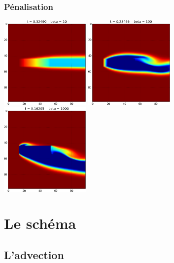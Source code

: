 \documentclass{beamer}
\begin{document}
  \begin{frame}
    \frametitle{Pénalisation}
    \begin{center}
      \includegraphics[width=0.33\textwidth]{penalisation_10.png}
      \includegraphics[width=0.33\textwidth]{penalisation_100.png}
      \includegraphics[width=0.33\textwidth]{penalisation_1000.png}
    \end{center}
  \end{frame}
  
\section{Le schéma}

	\subsection{L'advection}
		
\end{document}

